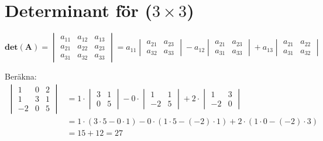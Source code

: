 \section{Determinant för ($3 \times 3$)} %
\label{sec:determinant_f_r_}
\begin{Def}
    \[
        \mathbf{det}(\mathbf{A}) = \begin{vmatrix} a_{11}&a_{12}&a_{13}\\a_{21}&a_{22}&a_{23}\\a_{31}&a_{32}&a_{33} \end{vmatrix} = a_{11} \begin{vmatrix} a_{21}&a_{23}\\a_{32}&a_{33} \end{vmatrix} - a_{12} \begin{vmatrix} a_{21}&a_{23}\\a_{31}&a_{33} \end{vmatrix} + a_{13} \begin{vmatrix} a_{21}&a_{22}\\a_{31}&a_{32} \end{vmatrix}
    \]
\end{Def}
\begin{Ex}
    Beräkna:
    \begin{align*}
    \begin{vmatrix} 1&0&2\\1&3&1\\-2&0&5 \end{vmatrix} &= 1 \cdot \begin{vmatrix} 3&1\\0&5 \end{vmatrix} - 0 \cdot \begin{vmatrix} 1&1\\-2&5 \end{vmatrix} + 2 \cdot \begin{vmatrix} 1&3\\-2&0 \end{vmatrix} \\
    &= 1 \cdot (3 \cdot 5 - 0 \cdot 1) - 0 \cdot (1 \cdot 5 - (-2) \cdot 1) + 2 \cdot (1 \cdot 0 - (-2) \cdot 3) \\
    &= 15 + 12 = 27
    \end{align*}
\end{Ex}
